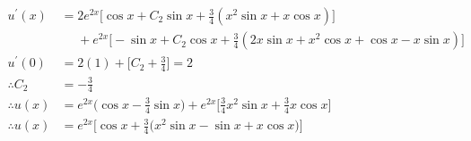 \documentclass[a4paper]{article}
\begin{document}
\begin{enumerate}
\begin{align*}
		u^{\prime}(x) & = 2e^{2x}\bigg[\cos{x} + C_2\sin{x} + \frac{3}{4}(x^2\sin{x} + x\cos{x}) \bigg]\\
		& \phantom{{}={}} + e^{2x}\bigg[-\sin{x} + C_2\cos{x} + \frac{3}{4}(2x\sin{x} + x^2\cos{x} + \cos{x} - x\sin{x}) \bigg]\\
		u^{\prime}(0) & = 2(1) + \bigg[C_2 + \frac{3}{4} \bigg] = 2\\
		\therefore C_2 & = -\frac{3}{4}\\
		\therefore u(x) & = e^{2x}\Big(\cos{x} -\frac{3}{4}\sin{x}\Big) + e^{2x}\bigg[\frac{3}{4}x^2\sin{x} + \frac{3}{4}x\cos{x} \bigg]\\
		\therefore u(x) & = e^{2x}\bigg[\cos{x} + \frac{3}{4} \big(x^2\sin{x} -\sin{x} + x\cos{x}\big) \bigg]\\
	\end{align*}



\end{enumerate}
\end{document}
